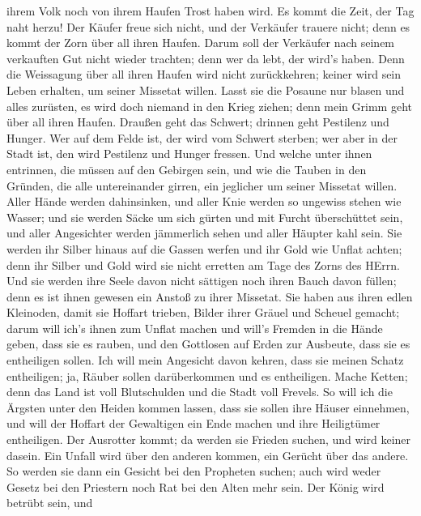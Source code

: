 ihrem Volk noch von ihrem Haufen Trost haben wird.  Es
kommt die Zeit, der Tag naht herzu! Der Käufer freue sich nicht, und der
Verkäufer trauere nicht; denn es kommt der Zorn über all ihren Haufen.
 Darum soll der Verkäufer nach seinem verkauften Gut nicht
wieder trachten; denn wer da lebt, der wird's haben. Denn die Weissagung
über all ihren Haufen wird nicht zurückkehren; keiner wird sein Leben
erhalten, um seiner Missetat willen.  Lasst sie die Posaune
nur blasen und alles zurüsten, es wird doch niemand in den Krieg ziehen;
denn mein Grimm geht über all ihren Haufen.  Draußen geht
das Schwert; drinnen geht Pestilenz und Hunger. Wer auf dem Felde ist,
der wird vom Schwert sterben; wer aber in der Stadt ist, den wird
Pestilenz und Hunger fressen.  Und welche unter ihnen
entrinnen, die müssen auf den Gebirgen sein, und wie die Tauben in den
Gründen, die alle untereinander girren, ein jeglicher um seiner Missetat
willen.  Aller Hände werden dahinsinken, und aller Knie
werden so ungewiss stehen wie Wasser;  und sie werden Säcke
um sich gürten und mit Furcht überschüttet sein, und aller Angesichter
werden jämmerlich sehen und aller Häupter kahl sein.  Sie
werden ihr Silber hinaus auf die Gassen werfen und ihr Gold wie Unflat
achten; denn ihr Silber und Gold wird sie nicht erretten am Tage des
Zorns des HErrn. Und sie werden ihre Seele davon nicht sättigen noch
ihren Bauch davon füllen; denn es ist ihnen gewesen ein Anstoß zu ihrer
Missetat.  Sie haben aus ihren edlen Kleinoden, damit sie
Hoffart trieben, Bilder ihrer Gräuel und Scheuel gemacht; darum will
ich's ihnen zum Unflat machen  und will's Fremden in die
Hände geben, dass sie es rauben, und den Gottlosen auf Erden zur
Ausbeute, dass sie es entheiligen sollen.  Ich will mein
Angesicht davon kehren, dass sie meinen Schatz entheiligen; ja, Räuber
sollen darüberkommen und es entheiligen.  Mache Ketten;
denn das Land ist voll Blutschulden und die Stadt voll Frevels.
 So will ich die Ärgsten unter den Heiden kommen lassen,
dass sie sollen ihre Häuser einnehmen, und will der Hoffart der
Gewaltigen ein Ende machen und ihre Heiligtümer entheiligen.
 Der Ausrotter kommt; da werden sie Frieden suchen, und
wird keiner dasein.  Ein Unfall wird über den anderen
kommen, ein Gerücht über das andere. So werden sie dann ein Gesicht bei
den Propheten suchen; auch wird weder Gesetz bei den Priestern noch Rat
bei den Alten mehr sein.  Der König wird betrübt sein, und
